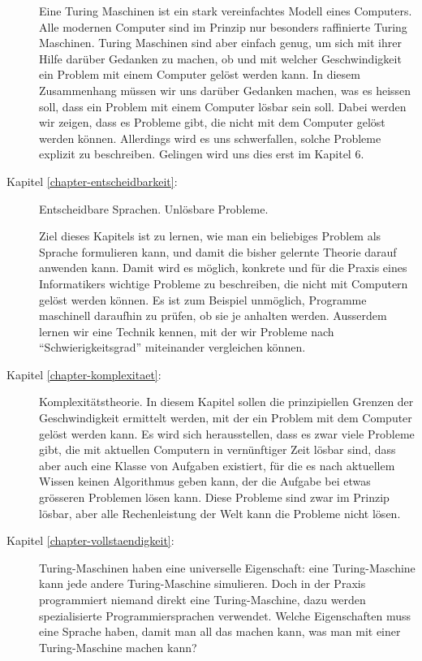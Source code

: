 \begin{description}
Eine Turing Maschinen ist ein stark vereinfachtes Modell eines Computers.
Alle modernen Computer sind im Prinzip nur besonders raffinierte Turing Maschinen.
Turing Maschinen sind aber einfach genug, um sich mit ihrer Hilfe darüber Gedanken
zu machen, ob und mit welcher Geschwindigkeit ein Problem mit einem
Computer gelöst werden kann. In diesem Zusammenhang müssen wir uns
darüber Gedanken machen, was es heissen soll, dass ein Problem mit
einem Computer lösbar sein soll. Dabei werden wir zeigen, dass es Probleme
gibt, die nicht mit dem Computer gelöst werden können. Allerdings wird
es uns schwerfallen, solche Probleme explizit zu beschreiben. 
Gelingen wird uns dies erst im Kapitel 6.

\item[Kapitel \ref{chapter-entscheidbarkeit}:] Entscheidbare Sprachen. Unlösbare Probleme.

Ziel dieses Kapitels ist zu lernen, wie man ein beliebiges Problem als
Sprache formulieren kann, und damit die bisher gelernte Theorie darauf
anwenden kann. Damit wird es möglich, konkrete und für die Praxis eines
Informatikers wichtige Probleme zu beschreiben, die
nicht mit Computern gelöst werden können.
Es ist zum Beispiel unmöglich, Programme maschinell daraufhin
zu prüfen, ob sie je anhalten werden.
Ausserdem lernen wir eine Technik kennen, mit der wir Probleme 
nach ``Schwierigkeitsgrad'' miteinander vergleichen können. 

\item[Kapitel \ref{chapter-komplexitaet}:] Komplexitätstheorie. In diesem Kapitel sollen 
die prinzipiellen Grenzen der Geschwindigkeit ermittelt werden,
mit der ein Problem mit dem Computer gelöst werden kann. Es wird sich
herausstellen, dass es zwar viele Probleme gibt, die mit aktuellen Computern in
vernünftiger Zeit lösbar sind, dass aber auch eine Klasse von Aufgaben
existiert, für die es nach aktuellem Wissen keinen Algorithmus geben kann,
der die Aufgabe bei etwas grösseren Problemen lösen kann. Diese Probleme sind
zwar im Prinzip lösbar, aber alle Rechenleistung der Welt kann die Probleme nicht lösen.

\item[Kapitel \ref{chapter-vollstaendigkeit}:]
Turing-Maschinen haben eine universelle Eigenschaft: eine Turing-Maschine
kann jede andere Turing-Maschine simulieren. Doch in der Praxis
programmiert niemand direkt eine Turing-Maschine, dazu werden
spezialisierte Programmiersprachen verwendet.
Welche Eigenschaften muss eine Sprache haben, damit
man all das machen kann, was man mit einer Turing-Maschine
machen kann?
\end{description}



